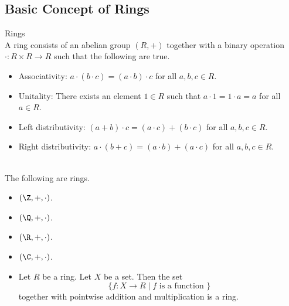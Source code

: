 \documentclass[a4paper]{article}
\begin{document}
\subsection{Basic Concept of Rings}
\begin{defn}{Rings}{}\\
A ring consists of an abelian group $(R,+)$ together with a binary operation $\cdot:R\times R\to R$ such that the following are true. 
\begin{itemize}
\item Associativity: $a\cdot(b\cdot c)=(a\cdot b)\cdot c$ for all $a,b,c\in R$. 
\item Unitality: There exists an element $1\in R$ such that $a\cdot 1=1\cdot a=a$ for all $a\in R$. 
\item Left distributivity: $(a+b)\cdot c=(a\cdot c)+(b\cdot c)$ for all $a,b,c\in R$. 
\item Right distributivity: $a\cdot(b+c)=(a\cdot b)+(a\cdot c)$ for all $a,b,c\in R$. 
\end{itemize}
\end{defn}

\begin{eg}{}{}\\
The following are rings. 
\begin{itemize}
\item $(\Z,+,\cdot)$. 
\item $(\Q,+,\cdot)$. 
\item $(\R,+,\cdot)$. 
\item $(\C,+,\cdot)$. 
\item Let $R$ be a ring. Let $X$ be a set. Then the set $$\{f:X\to R\;|\;f\text{ is a function }\}$$ together with pointwise addition and multiplication is a ring. 
\end{itemize}
\end{eg}
\end{document}
